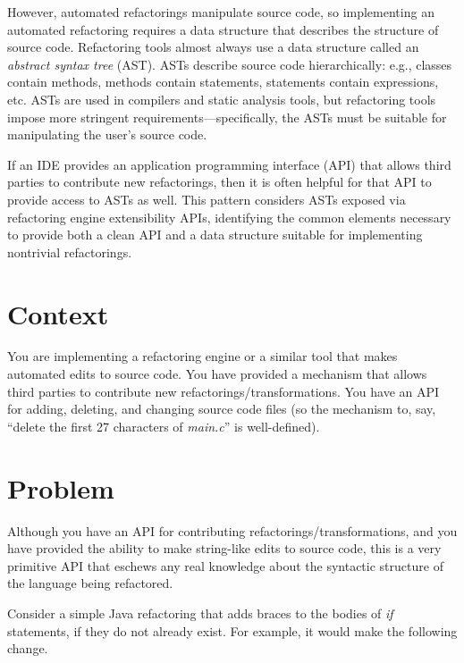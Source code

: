 \documentclass[prodmode]{acmlarge}
\begin{document}
However, automated refactorings manipulate source code, so implementing an
automated refactoring requires a data structure that describes the structure of
source code.  Refactoring tools almost always use a data structure called an
\textit{abstract syntax tree} (AST).  ASTs describe source code hierarchically:
e.g., classes contain methods, methods contain statements, statements contain
expressions, etc.  ASTs are used in compilers and static analysis tools, but
refactoring tools impose more stringent requirements---specifically, the ASTs
must be suitable for manipulating the user's source code.

If an IDE provides an application programming interface (API) that allows third
parties to contribute new refactorings, then it is often helpful for that API
to provide access to ASTs as well.  This pattern considers ASTs exposed via
refactoring engine extensibility APIs, identifying the common elements
necessary to provide both a clean API and a data structure suitable for
implementing nontrivial refactorings.

\section{Context}

You are implementing a refactoring engine or a similar tool that makes
automated edits to source code.  You have provided a mechanism that allows
third parties to contribute new refactorings/transformations.  You have an API
for adding, deleting, and changing source code files (so the mechanism to, say,
``delete the first 27 characters of \textit{main.c}'' is well-defined).

\section{Problem}
\label{sec:Problem}

Although you have an API for contributing refactorings/transformations, and you
have provided the ability to make string-like edits to source code, this is a
very primitive API that eschews any real knowledge about the syntactic
structure of the language being refactored.

Consider a simple Java refactoring that adds braces to the bodies of
\textit{if} statements, if they do not already exist.  For example, it would
make the following change.
\end{document}
